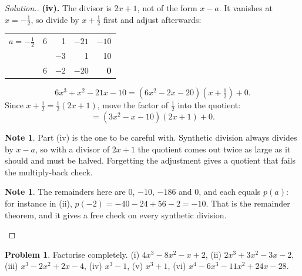 \documentclass[11pt,a4paper]{article}
\theoremstyle{definition}
\newtheorem{note}[thm]{Note}
\newtheorem{problemx}{Problem}[section]
\newenvironment{problem}{\begin{problemx}}{\end{problemx}}
\newenvironment{solution}
  {\renewcommand{\qedsymbol}{}\begin{proof}[\textit{Solution}.]}
  {\end{proof}}
\begin{document}
\begin{solution}
\textbf{(iv).} The divisor is $2x+1$, not of the form $x-a$. It vanishes at
$x=-\frac{1}{2}$, so divide by $x+\frac{1}{2}$ first and adjust afterwards:

\begin{table}[H]
\centering
\begin{tabular}{|c|r r r r|}
\hline
$a=-\frac{1}{2}$ & 6 & 1 & $-21$ & $-10$\\
                 &   & $-3$ & 1 & 10\\
\hline
                 & 6 & $-2$ & $-20$ & \textbf{0}\\
\hline
\end{tabular}
\end{table}

$$6x^3+x^2-21x-10=\left(6x^2-2x-20\right)\left(x+\tfrac{1}{2}\right)+0.$$
Since $x+\frac{1}{2}=\frac{1}{2}(2x+1)$, move the factor of $\frac{1}{2}$ into the
quotient:
$$=\left(3x^2-x-10\right)(2x+1)+0.$$

\begin{note}
Part (iv) is the one to be careful with. Synthetic division always divides by
$x-a$, so with a divisor of $2x+1$ the quotient comes out twice as large as it should
and must be halved. Forgetting the adjustment gives a quotient that fails the
multiply-back check.
\end{note}

\begin{note}
The remainders here are $0$, $-10$, $-186$ and $0$, and each equals $p(a)$: for
instance in (ii), $p(-2)=-40-24+56-2=-10$. That is the remainder theorem, and it
gives a free check on every synthetic division.
\end{note}
\end{solution}

\begin{problem}
Factorise completely.
\quad (i) $4x^3-8x^2-x+2$, \quad (ii) $2x^3+3x^2-3x-2$, \quad
(iii) $x^3-2x^2+2x-4$, \quad (iv) $x^3-1$, \quad (v) $x^3+1$, \quad
(vi) $x^4-6x^3-11x^2+24x-28$.
\end{problem}
\end{document}
